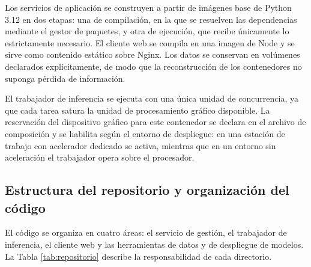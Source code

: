 Los servicios de aplicación se construyen a partir de imágenes base de Python
3.12 en dos etapas: una de compilación, en la que se resuelven las dependencias
mediante el gestor de paquetes, y otra de ejecución, que recibe únicamente lo
estrictamente necesario. El cliente web se compila en una imagen de Node y se
sirve como contenido estático sobre Nginx. Los datos se conservan en volúmenes
declarados explícitamente, de modo que la reconstrucción de los contenedores no
suponga pérdida de información.

El trabajador de inferencia se ejecuta con una única unidad de concurrencia, ya
que cada tarea satura la unidad de procesamiento gráfico disponible. La
reservación del dispositivo gráfico para este contenedor se declara en el archivo
de composición y se habilita según el entorno de despliegue: en una estación de
trabajo con acelerador dedicado se activa, mientras que en un entorno sin
aceleración el trabajador opera sobre el procesador.

\subsection{Estructura del repositorio y organización del código}

El código se organiza en cuatro áreas: el servicio de gestión, el trabajador de
inferencia, el cliente web y las herramientas de datos y de despliegue de
modelos. La Tabla \ref{tab:repositorio} describe la responsabilidad de cada
directorio.

